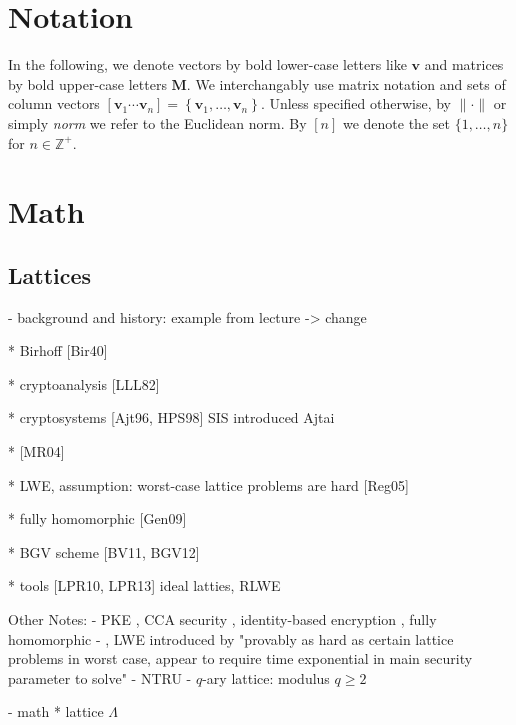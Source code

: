 \documentclass[
  a4paper,  %
  twoside,  %
  bibliography=totoc,
  headsepline,
  cleardoublepage=empty,
  parskip=half,
  draft=false
]{scrbook}
\begin{document}
\section{Notation}
In the following, we denote vectors by bold lower-case letters like $\mathbf{v}$ and matrices by bold upper-case letters $\mathbf{M}$. We interchangably use matrix notation and sets of column vectors $\left[\mathbf{v}_1 \cdots \mathbf{v}_n\right] = \left\{\mathbf{v}_1, \dots, \mathbf{v}_n\right\}$. Unless specified otherwise, by $\| \cdot \|$ or simply \textit{norm} we refer to the Euclidean norm. By $[n]$ we denote the set $\{1, \dots, n\}$ for $n\in \mathbb{Z}^+$.


\section{Math}



\subsection{Lattices}
- background and history: example from lecture -> change %

* Birhoff [Bir40]

* cryptoanalysis [LLL82]

* cryptosystems [Ajt96, HPS98]
SIS introduced Ajtai \cite{Ajt96}

* [MR04]

* LWE, assumption: worst-case lattice problems are hard [Reg05]

* fully homomorphic [Gen09]

* BGV scheme [BV11, BGV12]

* tools [LPR10, LPR13] ideal latties, RLWE

Other Notes: %
- PKE \cite{AD97, Reg03, Reg05}, CCA security \cite{PW08, Pei09}, identity-based encryption \cite{GPV08, CHKP10, ABB10}, fully homomorphic \cite{Gen09a}
- , LWE introduced by \cite{Reg05} "provably as hard as certain lattice problems in worst case, appear to require time exponential in main security parameter to solve"
- NTRU \cite{HPS98}
- $q$-ary lattice: modulus $q\geq 2$

- math %
* lattice $\Lambda$ %
\end{document}
